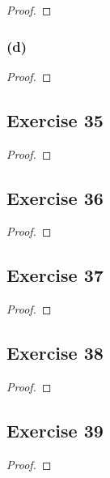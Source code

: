 \documentclass[14pt]{extarticle}
\begin{document}
\begin{proof}

\end{proof}

\subsubsection{(d)}

\begin{proof}

\end{proof}

\subsection{Exercise 35}

\begin{proof}

\end{proof}

\subsection{Exercise 36}

\begin{proof}

\end{proof}

\subsection{Exercise 37}

\begin{proof}

\end{proof}

\subsection{Exercise 38}

\begin{proof}

\end{proof}

\subsection{Exercise 39}

\begin{proof}

\end{proof}
\end{document}
